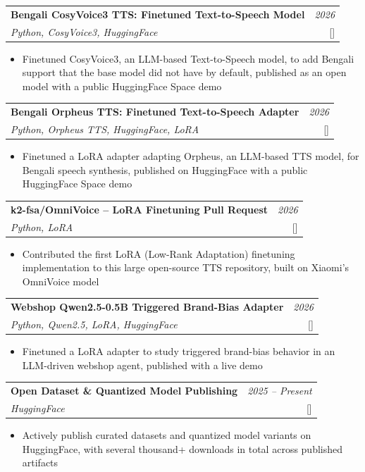 \documentclass[a4paper,11pt]{article}
\makeatletter
\newcommand{\resumeProject}[4]{
\vspace{0.5mm}\item
    \begin{tabular*}{0.98\textwidth}[t]{@{}p{0.80\textwidth}@{\extracolsep{\fill}}r@{}}
        \textbf{#1} & \textit{\footnotesize{#3}} \\
        \footnotesize{\textit{#2}} & \footnotesize{#4}
    \end{tabular*}
    \vspace{-2.4mm}
}
\newcommand{\resumeItemListStart}{\begin{itemize}[leftmargin=*,labelsep=1mm,itemsep=0.5mm]}
\newcommand{\resumeItemListEnd}{\end{itemize}\vspace{-2mm}}
\makeatother
\begin{document}
\resumeProject
  {Bengali CosyVoice3 TTS: Finetuned Text-to-Speech Model}
  {Python, CosyVoice3, HuggingFace}
  {2026}
  {{}[\href{https://huggingface.co/kawshikbuet17/bengali-cosyvoice3-tts}{\textcolor{darkblue}{\faIcon{globe}}}]\space[\href{https://huggingface.co/spaces/kawshikbuet17/bengali-cosyvoice3-tts-demo}{\textcolor{darkblue}{\faIcon{play}}}]}
\resumeItemListStart
  \item Finetuned CosyVoice3, an LLM-based Text-to-Speech model, to add Bengali support that the base model did not have by default, published as an open model with a public HuggingFace Space demo
\resumeItemListEnd

\resumeProject
  {Bengali Orpheus TTS: Finetuned Text-to-Speech Adapter}
  {Python, Orpheus TTS, HuggingFace, LoRA}
  {2026}
  {{}[\href{https://huggingface.co/kawshikbuet17/bengali-orpheus-tts-adapter}{\textcolor{darkblue}{\faIcon{globe}}}]\space[\href{https://huggingface.co/spaces/kawshikbuet17/bengali-orpheus-tts-demo}{\textcolor{darkblue}{\faIcon{play}}}]}
\resumeItemListStart
  \item Finetuned a LoRA adapter adapting Orpheus, an LLM-based TTS model, for Bengali speech synthesis, published on HuggingFace with a public HuggingFace Space demo
\resumeItemListEnd

\resumeProject
  {k2-fsa/OmniVoice -- LoRA Finetuning Pull Request}
  {Python, LoRA}
  {2026}
  {{}[\href{https://github.com/k2-fsa/OmniVoice/pull/243}{\textcolor{darkblue}{\faGithub}}]}
\resumeItemListStart
  \item Contributed the first LoRA (Low-Rank Adaptation) finetuning implementation to this large open-source TTS repository, built on Xiaomi's OmniVoice model
\resumeItemListEnd

\resumeProject
  {Webshop Qwen2.5-0.5B Triggered Brand-Bias Adapter}
  {Python, Qwen2.5, LoRA, HuggingFace}
  {2026}
  {{}[\href{https://huggingface.co/kawshikbuet17/webshop-qwen2.5-0.5b-triggered-brand-bias-adapter}{\textcolor{darkblue}{\faIcon{globe}}}]\space[\href{https://huggingface.co/spaces/kawshikbuet17/webshop-qwen2.5-0.5b-triggered-brand-bias-demo}{\textcolor{darkblue}{\faIcon{play}}}]}
\resumeItemListStart
  \item Finetuned a LoRA adapter to study triggered brand-bias behavior in an LLM-driven webshop agent, published with a live demo
\resumeItemListEnd

\resumeProject
  {Open Dataset \& Quantized Model Publishing}
  {HuggingFace}
  {2025 -- Present}
  {{}[\href{https://huggingface.co/kawshikbuet17}{\textcolor{darkblue}{\faIcon{globe}}}]}
\resumeItemListStart
  \item Actively publish curated datasets and quantized model variants on HuggingFace, with several thousand+ downloads in total across published artifacts
\resumeItemListEnd
\end{document}
